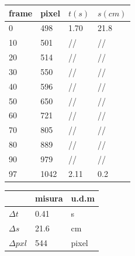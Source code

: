 \begin{tabular}{ | m{3em} | m{3em} | m{2.5em}| m{2.5em} | } 
 \hline
 \vspace{5pt} frame \vspace{5pt}  &  pixel & $t(s)$ & $s(cm)$\\ 
 \hline
 \hline
 0 & 498 & 1.70 & 21.8\\ 
 \hline
 10 & 501 & //  & //\\
 \hline
 20 & 514 & //  & //\\ 
 \hline
 30 & 550 & //  & //\\ 
 \hline
 40 & 596 & //  & //\\ 
 \hline
 50 & 650 & //  & //\\ 
 \hline
 60 & 721 & //  & //\\ 
 \hline
 70 & 805 & //  & //\\ 
 \hline
 80 & 889 & //  & //\\ 
 \hline
 90 & 979 & //  & //\\ 
 \hline
 97 & 1042 & 2.11  & 0.2\\ 
 \hline
\end{tabular}
\quad
\begin{tabular}{ | m{3em} | m{3em} | m{1cm}| } 
 \hline
   &  misura & u.d.m \\ 
 \hline
 \hline
 $\Delta t$   &  0.41 	& s\\
 \hline
 $\Delta s$   &  21.6	& cm\\
 \hline
 $\Delta pxl$ & 544	& pixel\\
 \hline
\end{tabular}
